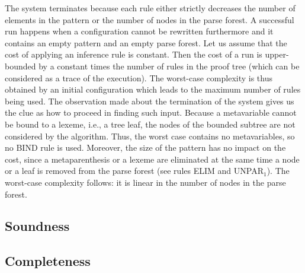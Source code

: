 The system terminates because each rule either strictly decreases the
number of elements in the pattern or the number of nodes in the parse
forest. A successful run happens when a configuration cannot be
rewritten furthermore and it contains an empty pattern and an empty
parse forest. Let us assume that the cost of applying an inference
rule is constant. Then the cost of a run is upper\hyp{}bounded by a
constant times the number of rules in the proof tree (which can be
considered as a trace of the execution). The worst\hyp{}case
complexity is thus obtained by an initial configuration which leads to
the maximum number of rules being used. The observation made about the
termination of the system gives us the clue as how to proceed in
finding such input. Because a meta\-variable cannot be bound to a
lexeme, i.e., a tree leaf, the nodes of the bounded subtree are not
considered by the algorithm. Thus, the worst case contains no
meta\-variables, so no \textsf{BIND} rule is used. Moreover, the size
of the pattern has no impact on the cost, since a meta\-parenthesis or
a lexeme are eliminated at the same time a node or a leaf is removed
from the parse forest (see rules \textsf{ELIM} and
\textsf{UNPAR}\(_1\)). The worst\hyp{}case complexity follows: it is
linear in the number of nodes in the parse forest.

\subsection{Soundness}


\subsection{Completeness}

